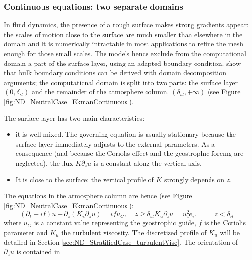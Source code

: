 \subsubsection{Continuous equations: two separate domains}
In fluid dynamics, the presence of a rough surface makes strong
gradients appear:
the scales of motion close to the surface are much smaller than
elsewhere in the domain and it is numerically
intractable in most applications
to refine the mesh enough for those small scales.
The models hence exclude from the computational domain
a part of the surface layer, using an adapted boundary
condition. \cite{mohammadi_rough_1998} show that bulk boundary
conditions can be derived with domain decomposition arguments;
the computational domain is split into two parts:
the surface layer $(0,\delta_{sl})$ and the remainder of
the atmosphere column, $(\delta_{sl}, +\infty)$
(see Figure \ref{fig:ND_NeutralCase_EkmanContinuous}).
%
\par
The surface layer has two main characteristics:
\begin{itemize}
	\item it is well mixed. The governing equation
		is usually stationary because the surface layer
		immediately adjusts to the external parameters.
		As a consequence (and because the Coriolis effect
		and the geostrophic forcing are neglected),
		the flux $K \partial_z u$
		is a constant along the vertical axis.
	\item It is close to the surface:
		the vertical profile of $K$ strongly depends 
		on $z$.
\end{itemize}
The equations in the atmosphere column are hence (see Figure
\ref{fig:ND_NeutralCase_EkmanContinuous}):
\begin{subequations}
	\label{eq:ND_NeutralCase_continuousModel}
	\begin{equation}
	\label{eq:ND_NeutralCase_EkmanEq}
  (\partial_t + if) u - \partial_z (K_u \partial_z u) = if u_G
		,~~~~~ z \geq \delta_{sl}
	\end{equation}
	\begin{equation}
	\label{eq:ND_NeutralCase_ConstantFlux}
	K_u \partial_z u
	= u_\star^2
	e_\tau, ~~~~~~~~~~~ z < \delta_{sl}
	\end{equation}
\end{subequations}
where $u_G$ is a constant value representing the geostrophic guide,
$f$ is the Coriolis parameter and $K_u$ the turbulent viscosity.
The discretized profile of $K_u$ will be
detailed in Section \ref{sec:ND_StratifiedCase_turbulentVisc}.
The orientation of $\partial_z u$ is contained in
